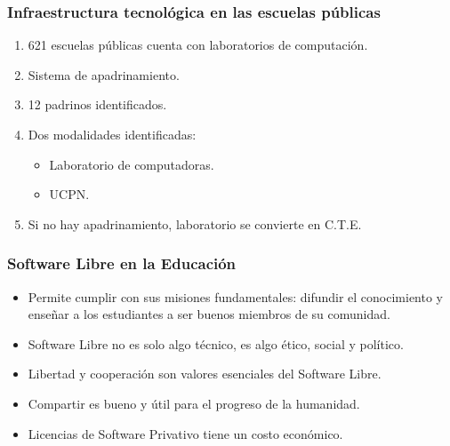 \documentclass{beamer}
\begin{document}
\begin{frame}
\frametitle{Infraestructura tecnol\'ogica en las escuelas p\'ublicas}
	\begin{enumerate}
		\pause \item 621 escuelas p\'ublicas cuenta con laboratorios de computaci\'on.
		\pause \item Sistema de apadrinamiento.
		\pause \item 12 padrinos identificados.
		\pause \item Dos modalidades identificadas:
			\begin{itemize} 
				\item Laboratorio de computadoras.
				\item UCPN.
			\end{itemize}
		\pause \item Si no hay apadrinamiento, laboratorio se convierte en C.T.E.
	\end{enumerate}
\end{frame}

\begin{frame}
\frametitle{Software Libre en la Educaci\'on}
             \begin{itemize}
		\pause \item Permite cumplir con sus misiones fundamentales: \alert{difundir} el conocimiento y ense\~nar a los estudiantes a ser \alert{buenos miembros} de su comunidad. 
		\pause \item Software Libre no es solo algo t\'ecnico, es algo \alert{\'etico}, social y pol\'itico.
		\pause \item \alert{Libertad} y cooperaci\'on son valores esenciales del Software Libre.
		\pause \item \alert{Compartir} es bueno y \'util para el progreso de la humanidad.
		\pause \item Licencias de Software Privativo tiene un costo econ\'omico.
	     \end{itemize}

\end{frame}
\end{document}
